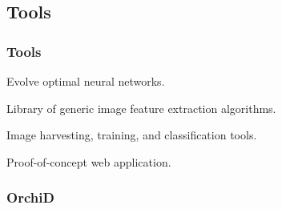 \documentclass[]{beamer}
\begin{document}
    \subsection{Tools}

    \begin{frame}
        \frametitle{Tools}

        \begin{description}[Tools]
            \item[\texttt{AI::FANN::Evolving}] Evolve optimal neural networks.
            \item[\texttt{ImgPheno}] Library of generic image feature extraction algorithms.
            \item[\texttt{NBClassify}] Image harvesting, training, and classification tools.
            \item[\texttt{OrchiD}] Proof-of-concept web application.
        \end{description}

    \end{frame}

    \begin{frame}[plain]
        \frametitle{OrchiD}

        \begin{center}
        \end{center}
    \end{frame}
\end{document}
